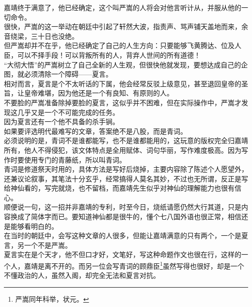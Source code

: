 \begin{multicols}{\theparacolNo}
嘉靖终于满意了，他已经确定，这个叫严嵩的人将会对他言听计从，并服从他的一切命令。\\

很快，严嵩的这一举动在朝廷中引起了轩然大波，指责声、骂声铺天盖地而来，余音绕梁，三十日也没绝。\\

但严嵩却并不在乎，他已经确定了自己的人生方向：只要能够飞黄腾达、位及人臣，可以不择手段！可以背叛所有的人，背弃人世间的所有道德！\\

“大彻大悟”的严嵩树立了自己全新的人生观，但很快他就发现，要想达成自己的企图，就必须清除一个障碍——夏言。\\

相对而言，夏言是个不太听话的下属，他会经常反驳上级意见，甚至退回皇帝的圣旨，让皇帝难堪，因为他还是一个有良知、有原则的人。\\

不要脸的严嵩准备除掉要脸的夏言，这似乎并不困难，但在实际操作中，严嵩才发现这几乎又是一个不可能完成的任务。\\

因为夏言还有一个他不具备的杀手锏。\\

如果要评选明代最难写的文章，答案绝不是八股，而是青词。\\

必须说明的是，青词不是谁都能写，也不是谁都能用的，这玩意的版权完全归嘉靖所有，他人不得侵犯，该文体特点是全用赋体、词句华丽，写作难度极高。因为写作时要使用专门的青藤纸，所以叫青词。\\

青词是修道祭天时用的，具体方法是写好后烧掉，主要内容除了陈述个人愿望外，还兼议论叙事，其笔法十分玄乎，经常搞得人莫名其妙，不过也无所谓，反正是写给神仙看的，写完就烧，也不留档，而嘉靖先生似乎对神仙的理解能力也很有信心。\\

顺便说一句，这一招并非嘉靖的专利，时至今日，烧纸请愿仍然大行其道，只是内容换成了简体字而已。要知道神仙都是很牛的，懂个七八国外语也很正常，相信还是能够看明白的。\\

在当时的朝廷中，会写这种文章的人很多，但能让嘉靖满意的只有两个，一个是夏言，另一个不是严嵩。\\

夏言实在是个天才，他不但口才好，文笔好，写这种命题作文也很在行，这样的一个人，嘉靖是离不开的。而另一位会写青词的顾鼎臣\footnote{严嵩同年科举，状元。}虽然写得也很好，却是一个不懂政治的人，虽然入阁，却完全无法和夏言对抗。\\


\end{multicols}
